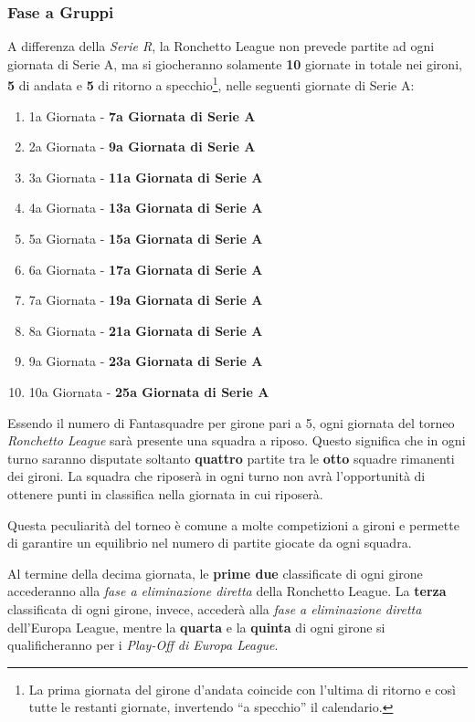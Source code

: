 \documentclass[12pt]{article}
\begin{document}
\subsubsection*{Fase a Gruppi}
A differenza della \textit{Serie R}, la Ronchetto League non prevede partite ad ogni giornata di Serie A, ma si giocheranno solamente \textbf{10} giornate in totale nei gironi, \textbf{5} di andata e \textbf{5} di ritorno a specchio\footnote{La prima giornata del girone d’andata coincide con l'ultima di ritorno e così tutte le restanti giornate, invertendo “a specchio” il calendario.}, nelle seguenti giornate di Serie A:
\begin{enumerate}
    \item 1a Giornata - \textbf{7a Giornata di Serie A}
    \item 2a Giornata - \textbf{9a Giornata di Serie A}
    \item 3a Giornata - \textbf{11a Giornata di Serie A}
    \item 4a Giornata - \textbf{13a Giornata di Serie A}
    \item 5a Giornata - \textbf{15a Giornata di Serie A}
    \item 6a Giornata - \textbf{17a Giornata di Serie A}
    \item 7a Giornata - \textbf{19a Giornata di Serie A}
    \item 8a Giornata - \textbf{21a Giornata di Serie A}
    \item 9a Giornata - \textbf{23a Giornata di Serie A}
    \item 10a Giornata - \textbf{25a Giornata di Serie A}
\end{enumerate}

Essendo il numero di Fantasquadre per girone pari a 5, ogni giornata del torneo \textit{Ronchetto League} sarà presente una squadra a riposo. Questo significa che in ogni turno saranno disputate soltanto \textbf{quattro} partite tra le \textbf{otto} squadre rimanenti dei gironi. La squadra che riposerà in ogni turno non avrà l'opportunità di ottenere punti in classifica nella giornata in cui riposerà. 

Questa peculiarità del torneo è comune a molte competizioni a gironi e permette di garantire un equilibrio nel numero di partite giocate da ogni squadra.

Al termine della decima giornata, le \textbf{prime due} classificate di ogni girone accederanno alla \textit{fase a eliminazione diretta} della Ronchetto League. La \textbf{terza} classificata di ogni girone, invece, accederà alla \textit{fase a eliminazione diretta} dell'Europa League, mentre la \textbf{quarta} e la \textbf{quinta} di ogni girone si qualificheranno per i \textit{Play-Off di Europa League}. 
\end{document}
